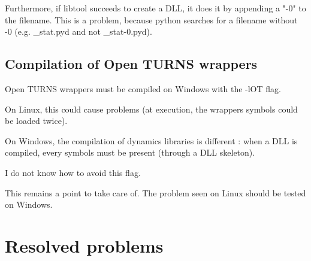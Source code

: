 \documentclass[11pt]{article}
\begin{document}
Furthermore, if libtool succeeds to create a DLL, it does it by appending a "-0" to the filename. This is a problem, because python searches for a filename without -0 (e.g. \_stat.pyd and not \_stat-0.pyd).


\subsection{Compilation of Open TURNS wrappers}

Open TURNS wrappers must be compiled on Windows with the -lOT flag.

On Linux, this could cause problems (at execution, the wrappers symbols could be loaded twice).

On Windows, the compilation of dynamics libraries is different : when a DLL is compiled, every symbols must be present (through a DLL skeleton).

I do not know how to avoid this flag.

This remains a point to take care of. The problem seen on Linux should be tested on Windows.

\section{Resolved problems}
\end{document}
